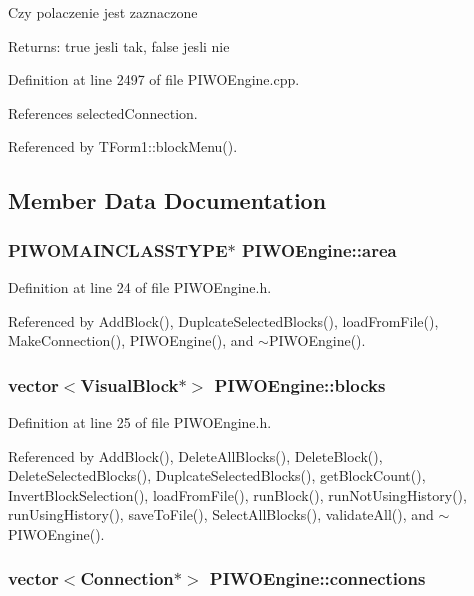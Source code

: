 Czy polaczenie jest zaznaczone \begin{Desc}
\item[Returns:]true jesli tak, false jesli nie \end{Desc}


Definition at line 2497 of file PIWOEngine.cpp.

References selectedConnection.

Referenced by TForm1::blockMenu().

\subsection{Member Data Documentation}
\hypertarget{classPIWOEngine_d5da32bb11409879f33eca9ebddfc9d6}{
\subsubsection[area]{\setlength{\rightskip}{0pt plus 5cm}PIWOMAINCLASSTYPE$\ast$ {\bf PIWOEngine::area}}}
\label{classPIWOEngine_d5da32bb11409879f33eca9ebddfc9d6}




Definition at line 24 of file PIWOEngine.h.

Referenced by AddBlock(), DuplcateSelectedBlocks(), loadFromFile(), MakeConnection(), PIWOEngine(), and $\sim$PIWOEngine().\hypertarget{classPIWOEngine_8cc6b573d0eacacc5043891a36b6e820}{
\subsubsection[blocks]{\setlength{\rightskip}{0pt plus 5cm}vector$<${\bf VisualBlock}$\ast$$>$ {\bf PIWOEngine::blocks}}}
\label{classPIWOEngine_8cc6b573d0eacacc5043891a36b6e820}




Definition at line 25 of file PIWOEngine.h.

Referenced by AddBlock(), DeleteAllBlocks(), DeleteBlock(), DeleteSelectedBlocks(), DuplcateSelectedBlocks(), getBlockCount(), InvertBlockSelection(), loadFromFile(), runBlock(), runNotUsingHistory(), runUsingHistory(), saveToFile(), SelectAllBlocks(), validateAll(), and $\sim$PIWOEngine().\hypertarget{classPIWOEngine_192e9886f89d0eee49173cc199afe561}{
\subsubsection[connections]{\setlength{\rightskip}{0pt plus 5cm}vector$<${\bf Connection}$\ast$$>$ {\bf PIWOEngine::connections}}}
\label{classPIWOEngine_192e9886f89d0eee49173cc199afe561}




